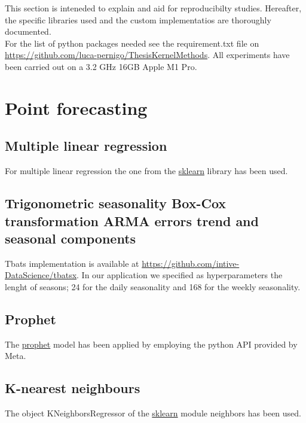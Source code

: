 This section is inteneded to explain and aid for reproducibilty studies. Hereafter, the specific libraries used and the custom implementatios are thoroughly documented.
\\
For the list of python packages needed see the requirement.txt file on \url{https://github.com/luca-pernigo/ThesisKernelMethods}\label{github_repo}.
All experiments have been carried out on a 3.2 GHz 16GB Apple M1 Pro.







\section{Point forecasting}
\subsection{Multiple linear regression}
For multiple linear regression the one from the \href{https://scikit-learn.org/stable/}{sklearn} library has been used.

\subsection{Trigonometric seasonality Box-Cox transformation ARMA errors trend and seasonal components}
Tbats implementation is available at \url{https://github.com/intive-DataScience/tbatsx}.
In our application we specified as hyperparameters the lenght of seasons; 24 for the daily seasonality and 168 for the weekly seasonality.

\subsection{Prophet}
The \href{https://facebook.github.io/prophet/docs/quick_start.html}{prophet} model has been applied by employing the python API provided by Meta.

\subsection{K-nearest neighbours}
The object KNeighborsRegressor of the \href{https://scikit-learn.org/stable/}{sklearn} module neighbors has been used.

